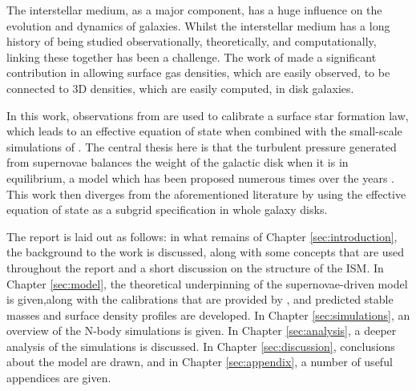 The interstellar medium, as a major component, has a huge influence on the evolution and dynamics of galaxies.
Whilst the interstellar medium has a long history of being studied observationally, theoretically, and computationally, linking these together has been a challenge.
The work of \citet{schaye_star_2004} made a significant contribution in allowing surface gas densities, which are easily observed, to be connected to 3D densities, which are easily computed, in disk galaxies.

In this work, observations from \citet{bigiel_star_2008} are used to calibrate a surface star formation law, which leads to an effective equation of state when combined with the small-scale simulations of \citet{martizzi_supernova_2015}.
The central thesis here is that the turbulent pressure generated from supernovae balances the weight of the galactic disk when it is in equilibrium, a model which has been proposed numerous times over the years \citep{silk_feedback_1997, ostriker_maximally_2011, faucher-giguere_feedback_2013, martizzi_supernova_2016}.
This work then diverges from the aforementioned literature by using the effective equation of state as a subgrid specification in whole galaxy disks.

The report is laid out as follows: in what remains of Chapter \ref{sec:introduction}, the background to the work is discussed, along with some concepts that are used throughout the report and a short discussion on the structure of the ISM.
In Chapter \ref{sec:model}, the theoretical underpinning of the supernovae-driven model is given,along with the calibrations that are provided by \citet{martizzi_supernova_2015}, and predicted stable masses and surface density profiles are developed.
In Chapter \ref{sec:simulations}, an overview of the N-body simulations is given.
In Chapter \ref{sec:analysis}, a deeper analysis of the simulations is discussed.
In Chapter \ref{sec:discussion}, conclusions about the model are drawn, and in Chapter \ref{sec:appendix}, a number of useful appendices are given.
